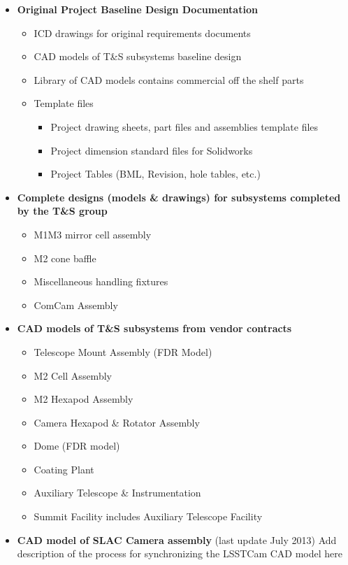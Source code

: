 \begin{itemize}
	\item {\bf Original Project Baseline Design Documentation}
	\begin{itemize}
		\item ICD drawings for original requirements documents
		\item CAD models of T\&S subsystems baseline design
		\item Library of CAD models contains commercial off the shelf parts
		\item Template files
		\begin{itemize}
			\item Project drawing sheets, part files and assemblies template files
			\item Project dimension standard files for Solidworks
			\item Project Tables (BML, Revision, hole tables, etc.)
		\end{itemize}
	\end{itemize}

	\item {\bf Complete designs (models \& drawings) for subsystems completed by the T\&S group}
	\begin{itemize}
		\item M1M3 mirror cell assembly
		\item M2 cone baffle
		\item Miscellaneous handling fixtures
		\item ComCam Assembly
	\end{itemize}

	\item {\bf CAD models of T\&S subsystems from vendor contracts}
	\begin{itemize}
		\item Telescope Mount Assembly (FDR Model)
		\item M2 Cell Assembly
		\item M2 Hexapod Assembly
		\item Camera Hexapod \& Rotator Assembly
		\item Dome (FDR model)
		\item Coating Plant
		\item Auxiliary Telescope \& Instrumentation
		\item Summit Facility includes Auxiliary Telescope Facility
	\end{itemize}

	\item{\bf CAD model of SLAC Camera assembly} (last update July 2013)  Add description of the process for synchronizing the LSSTCam CAD model here

\end{itemize}
